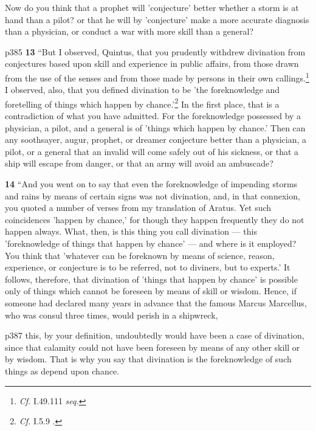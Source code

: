 Now do you think that a prophet will 'conjecture' better whether a storm is at hand than a pilot? or that he will by 'conjecture' make a more accurate diagnosis than a physician, or conduct a war with more skill than a general?

p385
\textbf{13} ``But I observed, Quintus, that you prudently withdrew divination from conjectures based upon skill and experience in public affairs, from those drawn from the use of the senses and from those made by persons in their own callings.\texthebrew{}\footnote{\emph{Cf.}
I.49.111 \emph{seq.}

} I observed, also, that you defined divination to be 'the foreknowledge and foretelling of things which happen by chance.'\texthebrew{}\footnote{\emph{Cf.}
I.5.9 .

} In the first place, that is a contradiction of what you have admitted. For the foreknowledge possessed by a physician, a pilot, and a general is of 'things which happen by chance.' Then can any soothsayer, augur, prophet, or dreamer conjecture better than a physician, a pilot, or a general that an invalid will come safely out of his sickness, or that a ship will escape from danger, or that an army will avoid an ambuscade?

\textbf{14} ``And you went on to say that even the foreknowledge of impending storms and rains by means of certain signs was not divination, and, in that connexion, you quoted a number of verses from my translation of Aratus. Yet such coincidences 'happen by chance,' for though they happen frequently they do not happen always. What, then, is this thing you call divination \texthebrew{—} this 'foreknowledge of things that happen by chance' \texthebrew{—} and where is it employed? You think that 'whatever can be foreknown by means of science, reason, experience, or conjecture is to be referred, not to diviners, but to experts.' It follows, therefore, that divination of 'things that happen by chance' is possible only of things which cannot be foreseen by means of skill or wisdom. Hence, if someone had declared many years in advance that the famous Marcus Marcellus, who was consul three times, would perish in a shipwreck,

p387 this, by your definition, undoubtedly would have been a case of divination, since that calamity could not have been foreseen by means of any other skill or by wisdom. That is why you say that divination is the foreknowledge of such things as depend upon chance.

